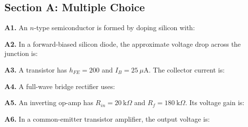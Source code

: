 \newpage
\begin{exercisebox}[29]

\subsection*{Section A: Multiple Choice}

\textbf{A1.} An $n$-type semiconductor is formed by
doping silicon with:


\vspace{0.4cm}

\textbf{A2.} In a forward-biased silicon diode,
the approximate voltage drop across the junction is:


\vspace{0.4cm}

\textbf{A3.} A transistor has $h_{FE} = 200$ and
$I_B = 25\ \mu\text{A}$. The collector current is:


\vspace{0.4cm}

\textbf{A4.} A full-wave bridge rectifier uses:


\vspace{0.4cm}

\textbf{A5.} An inverting op-amp has $R_{in}
= 20\ \text{k}\Omega$ and $R_f = 180\ \text{k}\Omega$.
Its voltage gain is:


\vspace{0.4cm}

\textbf{A6.} In a common-emitter transistor
amplifier, the output voltage is:



\end{exercisebox}
